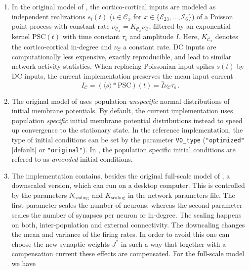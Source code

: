 \documentclass[10pt,a4paper,twoside,american]{article}
\theoremstyle{definitionstyle}
\newcommand{\tauS}{\tau_\text{s}}
\begin{document}
\begin{enumerate}
\item \label{remark:DC_stim} In the original model of \citet{Potjans14}, the cortico-cortical inputs are modeled as independent realizations $s_{i}(t)$ ($i\in\mathcal{C}_x$ for $x\in \{\mathcal{E}_{23},\ldots,\mathcal{I}_{6}\}$) of a Poisson point process with constant rate $\nu_{\mathcal{C}_{x}} = K_{\mathcal{C}_{x}}\nu_{\mathcal{C}}$, filtered by an exponential kernel $\text{PSC}(t)$ with time constant $\tauS$ and amplitude $\bar{I}$. 
Here, $K_{\mathcal{C}_{x}}$ denotes the cortico-cortical in-degree and $\nu_{\mathcal{C}}$ a constant rate.
DC inputs are computationally less expensive, exactly reproducible, and lead to similar network activity statistics.
When replacing Poissonian input spikes $s(t)$ by DC inputs, the current implementation preserves the mean input current
\begin{equation*}
    I_{\mathcal{C}} = (\langle s \rangle * \text{PSC})(t)
    = \bar{I} \nu_{\mathcal{C}} \tauS\, .
\end{equation*}
\item \label{remark:initial_conditions} The original model of \citet{Potjans14} uses population \emph{unspecific} normal distributions of initial membrane potentials.
By default, the current implementation uses population \emph{specific} initial membrane potential distributions instead to speed up convergence to the stationary state.
In the reference implementation, the type of initial conditions can be set by the parameter \texttt{V0\_type} (\texttt{"optimized"} [default] or \texttt{"original"}).
In \citep{Senk25_arxiv}, the population specific initial conditions are refered to as \emph{amended} initial conditions.
\item \label{remark:downscaling} The implementation contains, besides the original full-scale model of \citet{Potjans14}, a downscaled version, which can run on a desktop computer. This is controlled by the parameters \texttt{$N_{\text{scaling}}$} and \texttt{$K_{\text{scaling}}$} in the network parameters file. The first parameter scales the number of neurons, whereas the second parameter scales the number of synapses per neuron or in-degree. The scaling happens on both, inter-population and external connectivity.
The downcaling changes the mean and variance of the firing rates. In order to avoid this one can choose the new synaptic weights $J^{*}$ in such a way that together with a compensation current these effects are compensated. For the full-scale model we have
\begin{equation*}

\end{equation*}
\end{enumerate}
\end{document}
